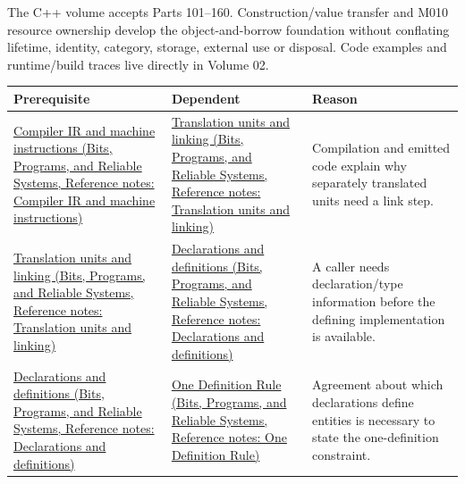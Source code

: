 \hypertarget{appendix-4ad47bdd269a-c---from-buildable-text-to-live-objects}{}

The C++ volume accepts Parts 101--160. Construction/value transfer and M010 resource ownership develop the object-and-borrow foundation without conflating lifetime, identity, category, storage, external use or disposal. Code examples and runtime/build traces live directly in {Volume 02}.

{\def\LTcaptype{none} %
\begin{longtable}[]{@{}
  >{\raggedright\arraybackslash}p{}
  >{\raggedright\arraybackslash}p{}
  >{\raggedright\arraybackslash}p{}@{}}
\toprule\noalign{}
\begin{minipage}[b]{\linewidth}\raggedright
Prerequisite
\end{minipage} & \begin{minipage}[b]{\linewidth}\raggedright
Dependent
\end{minipage} & \begin{minipage}[b]{\linewidth}\raggedright
Reason
\end{minipage} \\
\midrule\noalign{}
\endhead
\bottomrule\noalign{}
\endlastfoot
\href{../01-Bits-Programs-and-Reliable-Systems/main.pdf\#nameddest=appendix-942ad41afb30}{Compiler IR and machine instructions (Bits, Programs, and Reliable Systems, Reference notes: Compiler IR and machine instructions)} & \href{../01-Bits-Programs-and-Reliable-Systems/main.pdf\#nameddest=appendix-806686359e1b}{Translation units and linking (Bits, Programs, and Reliable Systems, Reference notes: Translation units and linking)} & Compilation and emitted code explain why separately translated units need a link step. \\
\href{../01-Bits-Programs-and-Reliable-Systems/main.pdf\#nameddest=appendix-806686359e1b}{Translation units and linking (Bits, Programs, and Reliable Systems, Reference notes: Translation units and linking)} & \href{../01-Bits-Programs-and-Reliable-Systems/main.pdf\#nameddest=appendix-2e4d494c2d94}{Declarations and definitions (Bits, Programs, and Reliable Systems, Reference notes: Declarations and definitions)} & A caller needs declaration/type information before the defining implementation is available. \\
\href{../01-Bits-Programs-and-Reliable-Systems/main.pdf\#nameddest=appendix-2e4d494c2d94}{Declarations and definitions (Bits, Programs, and Reliable Systems, Reference notes: Declarations and definitions)} & \href{../01-Bits-Programs-and-Reliable-Systems/main.pdf\#nameddest=appendix-49d27bc9d9a5}{One Definition Rule (Bits, Programs, and Reliable Systems, Reference notes: One Definition Rule)} & Agreement about which declarations define entities is necessary to state the one-definition constraint. \\

\end{longtable}}
